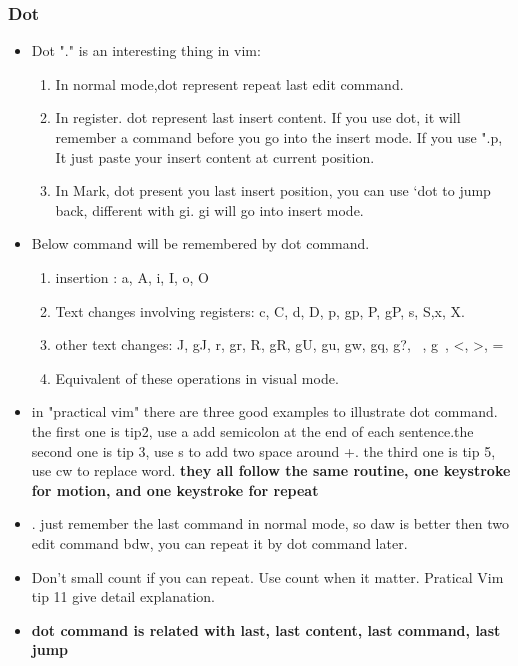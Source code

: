 \documentclass[a4paper,11pt,twoside]{book}
\begin{document}
\subsubsection{Dot}

\begin{itemize}

\item Dot "." is an interesting thing in vim:

		\begin{enumerate}
			\item In normal mode,dot represent repeat last edit command.
						
			\item In register. dot represent last insert content. If you use dot, it will remember a command before you go into the insert mode. If you use ".p, It just paste your insert content at current position. 

			\item In Mark, dot present you last insert position, you can use `dot to jump back, different with gi. gi will go into insert mode.
		\end{enumerate}

\item Below command will be remembered by dot command.
		\begin{enumerate}
				\item insertion : a, A, i, I, o, O

				\item Text changes involving registers: c, C, d, D, p, gp, P, gP, s, S,x, X.

				\item other text changes: J, gJ, r, gr, R, gR, gU, gu, gw, gq, g?, ~, g~, <, >, =

				\item Equivalent of these operations in visual mode.

		\end{enumerate}

		\item in "practical vim" there are three good examples to illustrate dot command. the first one is tip2, use a add semicolon at the end of each sentence.the second one is tip 3, use s to add two space around +. the third one is tip 5, use cw to replace word. \textbf{they all follow the same routine, one keystroke for motion, and one keystroke for repeat}
				
		\item . just remember the last command in normal mode, so daw is better then two edit command bdw, you can repeat it by dot command later.

		\item  Don't small count if you can repeat. Use count when it matter. Pratical Vim tip 11 give detail explanation. 	

		\item \textbf{dot command is related with last, last content, last command, last jump}

\end{itemize}
\end{document}
